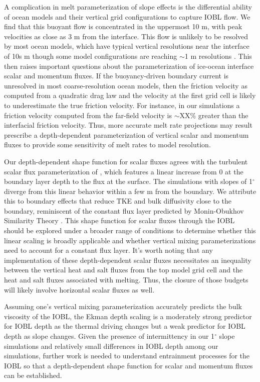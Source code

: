 \documentclass[draft]{agujournal2019}
\begin{document}
A complication in melt parameterization of slope effects is the differential ability of ocean models and their vertical grid configurations to capture IOBL flow. We find that this buoyant flow is concentrated in the uppermost 10 m, with peak velocities as close as 3 m from the interface. This flow is unlikely to be resolved by most ocean models, which have typical vertical resolutions near the interface of 10s m though some model configurations are reaching $\sim$1 m resolutions \cite{gwyther_cold_2020}. This then raises important questions about the parameterization of ice-ocean interface scalar and momentum fluxes. If the buoyancy-driven boundary current is unresolved in most coarse-resolution ocean models, then the friction velocity as computed from a quadratic drag law and the velocity at the first grid cell is likely to underestimate the true friction velocity. For instance, in our simulations a friction velocity computed from the far-field velocity is $\sim$XX\% greater than the interfacial friction velocity. Thus, more accurate melt rate projections may result prescribe a depth-dependent parameterization of vertical scalar and momentum fluxes to provide some sensitivity of melt rates to model resolution. 

Our depth-dependent shape function for scalar fluxes agrees with the turbulent scalar flux parameterization of , which features a linear increase from 0 at the boundary layer depth to the flux at the surface. The simulations with slopes of 1$^{\circ}$ diverge from this linear behavior within a few m from the boundary. We attribute this to boundary effects that reduce TKE and bulk diffusivity close to the boundary, reminiscent of the constant flux layer predicted by Monin-Obukhov Similarity Theory \cite{monin_basic_1954}. This shape function for scalar fluxes through the IOBL should be explored under a broader range of conditions to determine whether this linear scaling is broadly applicable and whether vertical mixing parameterizations need to account for a constant flux layer. It's worth noting that any implementation of these depth-dependent scalar fluxes necessitates an inequality between the vertical heat and salt fluxes from the top model grid cell and the heat and salt fluxes associated with melting. Thus, the closure of those budgets will likely involve horizontal scalar fluxes as well.

Assuming one's vertical mixing parameterization accurately predicts the bulk viscosity of the IOBL, the Ekman depth scaling is a moderately strong predictor for IOBL depth as the thermal driving changes but a weak predictor for IOBL depth as slope changes. Given the presence of intermittency in our 1$^{\circ}$ slope simulations and relatively small differences in IOBL depth among our simulations, further work is needed to understand entrainment processes for the IOBL so that a depth-dependent shape function for scalar and momentum fluxes can be established. 
\end{document}
